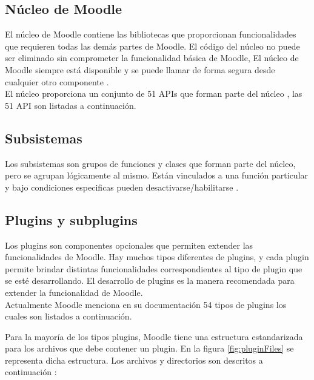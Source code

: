 \subsection{Núcleo de Moodle}
El núcleo de Moodle contiene las bibliotecas que proporcionan funcionalidades que requieren todas las demás partes de Moodle. El código del núcleo no puede ser eliminado sin comprometer la funcionalidad básica de Moodle, El núcleo de Moodle siempre está disponible y se puede llamar de forma segura desde cualquier otro componente \cite{moodleComponets}. \\

\noindent El núcleo proporciona un conjunto de 51 APIs que forman parte del núcleo \cite{moodleCoreAPIs}, las 51 API son listadas a continuación.

 \begin{multicols}{3}
    
 \end{multicols}
\subsection{Subsistemas}
Los subsistemas son grupos de funciones y clases que forman parte del núcleo, pero se agrupan lógicamente al mismo. Están vinculados a una función particular y bajo condiciones especificas pueden desactivarse/habilitarse \cite{moodleComponets}.
    
\subsection{Plugins y subplugins}\label{subsec:plugins}
Los plugins son componentes opcionales que permiten extender las funcionalidades de Moodle. Hay muchos tipos diferentes de plugins, y cada plugin permite brindar distintas funcionalidades correspondientes al tipo de plugin que se esté desarrollando. El desarrollo de plugins es la manera recomendada para extender la funcionalidad de Moodle.\\

\noindent Actualmente Moodle menciona en su documentación 54 tipos de plugins los cuales son listados a continuación.

\begin{multicols}{3}
    
\end{multicols}

\clearpage
\noindent Para la mayoría de los tipos plugins, Moodle tiene una estructura estandarizada para los archivos que debe contener un plugin. En la figura \ref{fig:pluginFiles} se representa dicha estructura. Los archivos y directorios son descritos a continuación \cite{moodlePluginfiles}:


